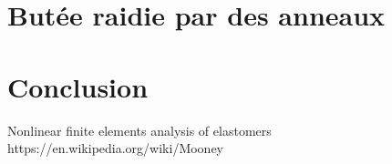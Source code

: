 ﻿ \documentclass{article}
\begin{document}
\section{Butée raidie par des anneaux}


\section{Conclusion}

\listoffigures

\begin{thebibliography}{9}
 Nonlinear finite elements analysis of elastomers
 https://en.wikipedia.org/wiki/Mooney%
\end{thebibliography}
\end{document}
